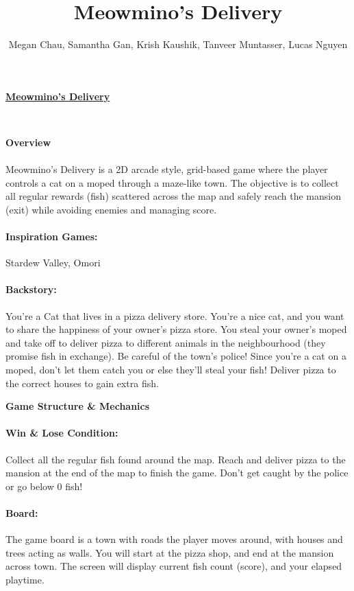 \documentclass{article}
\title{Meowmino's Delivery}
\author{Megan Chau, Samantha Gan, Krish Kaushik, Tanveer Muntasser, Lucas Nguyen}
\begin{document}

{\centering \LARGE \underline{\textbf{Meowmino's Delivery}}\\}
\bigskip

{\\}

\bigskip
{\centering \large{\textbf{Overview}}\\}

\paragraph{}
Meowmino’s Delivery is a 2D arcade style, grid-based game where the player controls a cat on a moped through a maze-like town. The objective is to collect all regular rewards (fish) scattered across the map and safely reach the mansion (exit) while avoiding enemies and managing score.

\paragraph{Inspiration Games:}Stardew Valley, Omori 

\paragraph{Backstory:}You're a Cat that lives in a pizza delivery store. You're a nice cat, and you want to share the happiness of your owner's pizza store. You steal your owner's moped and take off to deliver pizza to different animals in the neighbourhood (they promise fish in exchange). Be careful of the town’s police! Since you’re a cat on a moped, don’t let them catch you or else they’ll steal your fish! Deliver pizza to the correct houses to gain extra fish. 

\bigskip
{\centering \large{\textbf{Game Structure \& Mechanics}}\\}
\smallskip

\paragraph{Win \& Lose Condition:}Collect all the regular fish found around the map. Reach and deliver pizza to the mansion at the end of the map to finish the game. Don't get caught by the police or go below 0 fish!

\paragraph{Board:}The game board is a town with roads the player moves around, with houses and trees acting as walls. You will start at the pizza shop, and end at the mansion across town.
The screen will display current fish count (score), and your elapsed playtime.
\end{document}
